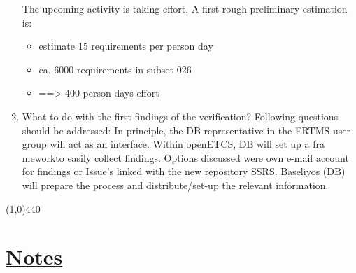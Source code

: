 \documentclass[a4paper]{article}
\begin{document}
\begin{enumerate}
The upcoming activity is taking effort. A first rough preliminary estimation is:
 
\begin{itemize}
\item estimate 15 requirements per person day
\item ca. 6000 requirements in subset-026
\item ==> 400 person days effort
\end{itemize}

\item What to do with the first findings of the verification? Following questions should be addressed:
In principle, the DB representative in the ERTMS user group will act as an interface. Within openETCS, DB will set up a fra meworkto easily collect findings. Options discussed were own e-mail account for findings or Issue's linked with the new repository SSRS. Baseliyos (DB) will prepare the process and distribute/set-up the relevant information.

\end{enumerate}

\line(1,0){440}
\section*{\underline{Notes}}
\end{document}
